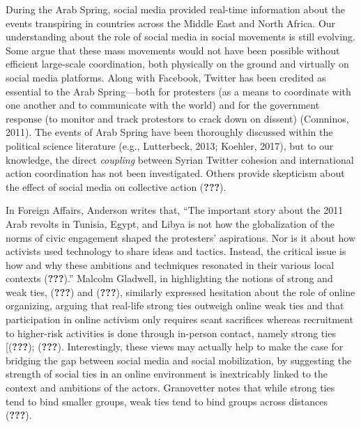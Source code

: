 \documentclass[english,man]{apa6}
\begin{document}
During the Arab Spring, social media provided real-time information about the events transpiring in countries across the Middle East and North Africa. Our understanding about the role of social media in social movements is still evolving. Some argue that these mass movements would not have been possible without
efficient large-scale coordination, both physically on the ground and virtually
on social media platforms. Along with Facebook, Twitter has been credited as
essential to the Arab Spring---both for protesters (as a means to coordinate
with one another and to communicate with the world) and for the government
response (to monitor and track protestors to crack down on dissent)
(Comninos, 2011). The events of Arab Spring have been thoroughly
discussed within the political science literature
(e.g., Lutterbeck, 2013; Koehler, 2017), but to our knowledge,
the direct \emph{coupling} between Syrian Twitter cohesion and international action
coordination has not been investigated. Others provide skepticism about the effect of social media on collective action ({\textbf{???}}).

In Foreign Affairs, Anderson writes that, \enquote{The important story about the 2011 Arab revolts in Tunisia, Egypt, and Libya is not how the globalization of the norms of civic engagement shaped the protesters' aspirations. Nor is it about how activists used technology to share ideas and tactics. Instead, the critical issue is how and why these ambitions and techniques resonated in their various local contexts ({\textbf{???}}).} Malcolm Gladwell, in highlighting the notions of strong and weak ties, ({\textbf{???}}) and ({\textbf{???}}), similarly expressed hesitation about the role of online organizing, arguing that real-life strong ties outweigh online weak ties and that participation in online activism only requires scant sacrifices whereas recruitment to higher-risk activities is done through in-person contact, namely strong ties {[}({\textbf{???}}); ({\textbf{???}}). Interestingly, these views may actually help to make the case for bridging the gap between social media and social mobilization, by suggesting the strength of social ties in an online environment is inextricably linked to the context and ambitions of the actors. Granovetter notes that while strong ties tend to bind smaller groups, weak ties tend to bind groups across distances ({\textbf{???}}).
\end{document}
